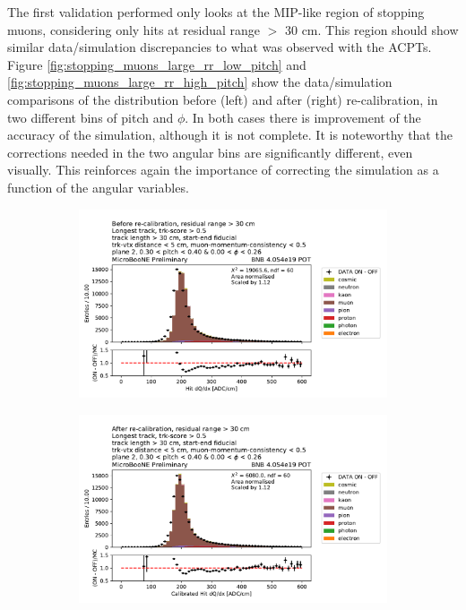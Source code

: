 The first validation performed only looks at the MIP-like region of stopping muons, considering only hits at residual range $>$ 30 cm.
This region should show similar data/simulation discrepancies to what was observed with the ACPTs.
Figure \ref{fig:stopping_muons_large_rr_low_pitch} and \ref{fig:stopping_muons_large_rr_high_pitch} show the data/simulation comparisons of the \dqdx distribution before (left) and after (right) re-calibration, in two different bins of pitch and $\phi$.
In both cases there is improvement of the accuracy of the simulation, although it is not complete.
It is noteworthy that the corrections needed in the two angular bins are significantly different, even visually.
This reinforces again the importance of correcting the simulation as a function of the angular variables.

\begin{figure}[H] 
\begin{center}
    \begin{subfigure}[b]{0.45\textwidth}
    \centering
    \includegraphics[width=1.00\textwidth]{stopping_muons_protons/030_pitch_040_000_phi_026apres.pdf}
    \end{subfigure}
    \begin{subfigure}[b]{0.45\textwidth}
    \centering
    \includegraphics[width=1.00\textwidth]{stopping_muons_protons/030_pitch_040_000_phi_026depois.pdf}

\end{subfigure}
\end{center}
\end{figure}
